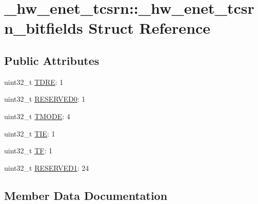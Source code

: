 \hypertarget{struct__hw__enet__tcsrn_1_1__hw__enet__tcsrn__bitfields}{}\section{\+\_\+hw\+\_\+enet\+\_\+tcsrn\+:\+:\+\_\+hw\+\_\+enet\+\_\+tcsrn\+\_\+bitfields Struct Reference}
\label{struct__hw__enet__tcsrn_1_1__hw__enet__tcsrn__bitfields}
\subsection*{Public Attributes}
\begin{DoxyCompactItemize}
\item 
uint32\+\_\+t \hyperlink{struct__hw__enet__tcsrn_1_1__hw__enet__tcsrn__bitfields_ac54a8b4d6c7b6bda9be14a58ab6bee5b}{T\+D\+RE}\+: 1
\item 
uint32\+\_\+t \hyperlink{struct__hw__enet__tcsrn_1_1__hw__enet__tcsrn__bitfields_af1cced40bdaf76d46f90c48b0190c72d}{R\+E\+S\+E\+R\+V\+E\+D0}\+: 1
\item 
uint32\+\_\+t \hyperlink{struct__hw__enet__tcsrn_1_1__hw__enet__tcsrn__bitfields_adb53544c4a8293bdfa502a7b67235e6e}{T\+M\+O\+DE}\+: 4
\item 
uint32\+\_\+t \hyperlink{struct__hw__enet__tcsrn_1_1__hw__enet__tcsrn__bitfields_a1737ff55f9c67d7271d9fdb6cbdf0f33}{T\+IE}\+: 1
\item 
uint32\+\_\+t \hyperlink{struct__hw__enet__tcsrn_1_1__hw__enet__tcsrn__bitfields_aa946888b084a27327f1e16b942f76eca}{TF}\+: 1
\item 
uint32\+\_\+t \hyperlink{struct__hw__enet__tcsrn_1_1__hw__enet__tcsrn__bitfields_a06c848824674c1d7194d46f208c90d56}{R\+E\+S\+E\+R\+V\+E\+D1}\+: 24
\end{DoxyCompactItemize}


\subsection{Member Data Documentation}
